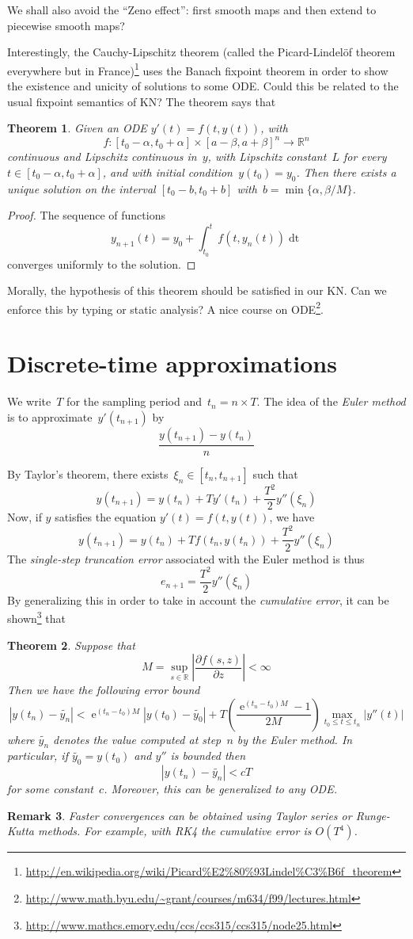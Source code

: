 \documentclass{article}
\newtheorem{theorem}{Theorem}
\newtheorem{remark}[theorem]{Remark}
\newcommand{\ce}{\mathop{\mathrm{e}}}
\newcommand{\dd}[1]{\mathop{\mathrm{d}#1}}
\newcommand{\R}{\mathbb{R}}
\begin{document}
We shall also avoid the ``Zeno effect'': first smooth maps and then extend to
piecewise smooth maps?

Interestingly, the Cauchy-Lipschitz theorem (called the Picard-Lindelöf theorem
everywhere but in
France)\footnote{\url{http://en.wikipedia.org/wiki/Picard\%E2\%80\%93Lindel\%C3\%B6f_theorem}}
uses the Banach fixpoint theorem in order to show the existence and unicity of
solutions to some ODE. Could this be related to the usual fixpoint semantics
of KN? The theorem says that

\begin{theorem}
  Given an ODE $y'(t)=f(t,y(t))$, with
  \[
  f:[t_0-\alpha,t_0+\alpha]\times[a-\beta,a+\beta]^n\to\R^n
  \]
  continuous and Lipschitz continuous in~$y$, with Lipschitz constant~$L$ for
  every \hbox{$t\in[t_0-\alpha,t_0+\alpha]$}, and with initial
  condition~$y(t_0)=y_0$.  Then there exists a unique solution on the interval
  $[t_0-b,t_0+b]$ with~$b=\min\{\alpha,\beta/M\}$.
\end{theorem}
\begin{proof}
  The sequence of functions
  \[
  y_{n+1}(t)=y_0+\int_{t_0}^tf(t,y_n(t))\dd t
  \]
  converges uniformly to the solution.
\end{proof}

Morally, the hypothesis of this theorem should be satisfied in our KN. Can we
enforce this by typing or static analysis? A nice course on
ODE\footnote{\url{http://www.math.byu.edu/~grant/courses/m634/f99/lectures.html}}.

\section{Discrete-time approximations}
We write~$T$ for the sampling period and~$t_n=n\times T$. The idea of the
\emph{Euler method} is to approximate~$y'(t_{n+1})$ by
\[
\frac{y(t_{n+1})-y(t_n)}n
\]

By Taylor's theorem, there exists~$\xi_n\in[t_n,t_{n+1}]$ such that
\[
y(t_{n+1})=y(t_n)+Ty'(t_n)+\frac{T^2}2 y''(\xi_n)
\]
Now, if $y$ satisfies the equation $y'(t)=f(t,y(t))$, we have
\[
y(t_{n+1})=y(t_n)+Tf(t_n,y(t_n))+\frac{T^2}2 y''(\xi_n)
\]
The \emph{single-step truncation error} associated with the Euler method is thus
\[
e_{n+1}=\frac{T^2}2 y''(\xi_n)
\]
By generalizing this in order to take in account the \emph{cumulative error}, it
can be
shown\footnote{\url{http://www.mathcs.emory.edu/ccs/ccs315/ccs315/node25.html}}
that

\begin{theorem}
  Suppose that
  \[
  M=\sup_{s\in\R}\left|\frac{\partial f(s,z)}{\partial z}\right|<\infty
  \]
  Then we have the following error bound
  \[
  |y(t_n)-\tilde{y_n}|<\ce^{(t_n-t_0)M}|y(t_0)-\tilde{y_0}|+T\left(\frac{\ce^{(t_n-t_0)M}-1}{2M}\right)\max_{t_0\leq t\leq t_n}|y''(t)|
  \]
  where $\tilde{y_n}$ denotes the value computed at step~$n$ by the Euler
  method. In particular, if $\tilde{y_0}=y(t_0)$ and $y''$ is bounded then
  \[
  |y(t_n)-\tilde{y_n}|<cT
  \]
  for some constant~$c$. Moreover, this can be generalized to any ODE.
\end{theorem}

\begin{remark}
  Faster convergences can be obtained using Taylor series or Runge-Kutta
  methods. For example, with RK4 the cumulative error is $O(T^4)$.
\end{remark}




\end{document}
